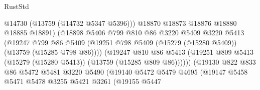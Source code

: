 \begin{lexlean}{RustStd}
\begin{coremodule}
                                        @14730
                                        (@13759 (@14732 @5347 @5396)))
                                      @18870
                                      @18873
                                      @18876
                                      @18880
                                      @18885
                                      @18891)
                                    (@18898
                                      @5406
                                      @799
                                      @810
                                      @86
                                      @3220
                                      @5409
                                      @3220
                                      @5413
                                      (@19247
                                        @799
                                        @86
                                        @5409
                                        (@19251
                                          @798
                                          @5409
                                          (@15279 (@15280 @5409))
                                          (@13759 (@15285 @798 @86))))
                                      (@19247
                                        @810
                                        @86
                                        @5413
                                        (@19251
                                          @809
                                          @5413
                                          (@15279 (@15280 @5413))
                                          (@13759 (@15285 @809 @86))))))
                                  (@19130
                                    @822
                                    @833
                                    @86
                                    @5472
                                    @5481
                                    @3220
                                    @5490
                                    (@19140
                                      @5472
                                      @5479
                                      @4695
                                      (@19147
                                        @5458
                                        @5471
                                        @5478
                                        @3255
                                        @5421
                                        @3261
                                        (@19155
                                          @5447

\end{coremodule}
\end{lexlean}
